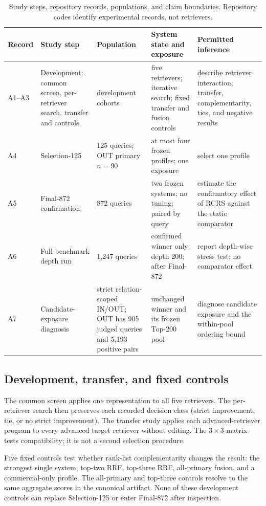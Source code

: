 \documentclass[final,5p,times,twocolumn]{elsarticle}
\newcommand{\RCRS}{RCRS}
\newenvironment{widejournal}{\begin{table}[!t]}{\end{table}}
\newcommand{\journalTableFont}{\footnotesize}
\newenvironment{widejournal}{\begin{table}[!htbp]}{\end{table}}
\newcommand{\journalTableFont}{\footnotesize}
\begin{document}
\begin{widejournal}
\caption{Study steps, repository records, populations, and claim boundaries.
Repository codes identify experimental records, not retrievers.}
\label{tab:protocol}
\centering
\journalTableFont
\renewcommand{\arraystretch}{0.98}
\begin{tabularx}{\textwidth}{@{}P{1.2cm}P{2.3cm}P{2.6cm}P{3.4cm}Y@{}}
\toprule
Record & Study step & Population & System state and exposure & Permitted inference \\
\midrule
\mbox{A1--A3} & Development: common screen, per-retriever search, transfer and controls
& development cohorts & five retrievers; iterative search; fixed transfer and
fusion controls & describe retriever interaction, transfer, complementarity,
ties, and negative results \\
A4 & Selection-125 & 125 queries; OUT primary \(n=90\) & at most four frozen
profiles; one exposure & select one profile \\
A5 & Final-872 confirmation & 872 queries & two frozen systems; no tuning;
paired by query & estimate the confirmatory effect of \RCRS{} against the
static comparator \\
A6 & Full-benchmark depth run & 1,247 queries & confirmed winner only; depth
200; after Final-872 & report depth-wise stress test; no comparator effect \\
A7 & Candidate-exposure diagnosis & strict relation-scoped IN/OUT; OUT has 905
judged queries and 5,193 positive pairs & unchanged winner and its frozen
Top-200 pool & diagnose candidate exposure and the within-pool ordering bound \\
\bottomrule
\end{tabularx}
\end{widejournal}

\subsection{Development, transfer, and fixed controls}

The common screen applies one representation to all five retrievers. The
per-retriever search then preserves each recorded decision class (strict
improvement, tie, or no strict improvement). The transfer study applies each
advanced-retriever program to every advanced target retriever without editing.
The \(3\times3\) matrix tests compatibility; it is not a second selection
procedure.

Five fixed controls test whether rank-list complementarity changes the result:
the strongest single system, top-two RRF, top-three RRF, all-primary fusion,
and a commercial-only profile. The all-primary and top-three controls resolve
to the same aggregate scores in the canonical artifact. None of these
development controls can replace Selection-125 or enter Final-872 after
inspection.
\end{document}
